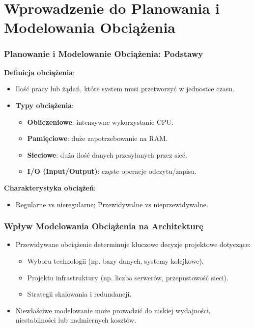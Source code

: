 \documentclass[aspectratio=169,xcolor=table]{beamer}
\begin{document}
\section{Wprowadzenie do Planowania i Modelowania Obciążenia}

\begin{frame}
  \frametitle{Planowanie i Modelowanie Obciążenia: Podstawy}
  \textbf{Definicja obciążenia}:
  \begin{itemize}
    \item Ilość pracy lub żądań, które system musi przetworzyć w jednostce czasu.
    \item \textbf{Typy obciążenia}:
        \begin{itemize}
            \item \textbf{Obliczeniowe}: intensywne wykorzystanie CPU.
            \item \textbf{Pamięciowe}: duże zapotrzebowanie na RAM.
            \item \textbf{Sieciowe}: duża ilość danych przesyłanych przez sieć.
            \item \textbf{I/O (Input/Output)}: częste operacje odczytu/zapisu.
        \end{itemize}
  \end{itemize}
  \vspace{0.5em}
  \textbf{Charakterystyka obciążeń}:
  \begin{itemize}
    \item Regularne vs nieregularne; Przewidywalne vs nieprzewidywalne.
  \end{itemize}
\end{frame}

\begin{frame}
  \frametitle{Wpływ Modelowania Obciążenia na Architekturę}
  \begin{itemize}
    \item Przewidywane obciążenie determinuje kluczowe decyzje projektowe dotyczące:
        \begin{itemize}
            \item Wyboru technologii (np. bazy danych, systemy kolejkowe).
            \item Projektu infrastruktury (np. liczba serwerów, przepustowość sieci).
            \item Strategii skalowania i redundancji.
        \end{itemize}
    \item Niewłaściwe modelowanie może prowadzić do niskiej wydajności, niestabilności lub nadmiernych kosztów.
  \end{itemize}
\end{frame}
\end{document}
